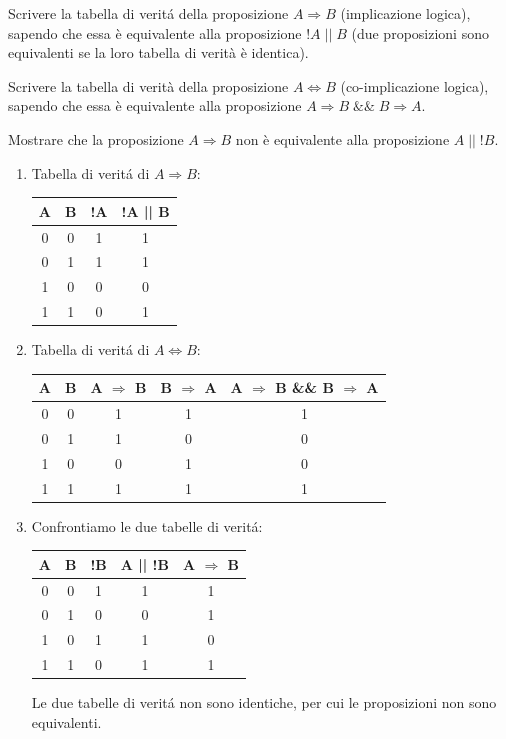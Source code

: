 \begin{Exercise}[label={ex:implicazione}]
		\Question Scrivere la tabella di verit\'a della proposizione $A \Rightarrow B$ (implicazione logica), sapendo che essa \`e equivalente alla proposizione $!A \; || \; B$ (due proposizioni sono equivalenti se la loro tabella di verit\`a \`e identica).

		\Question Scrivere la tabella di verit\`a della proposizione $A \Leftrightarrow B$ (co-implicazione logica), sapendo che essa \`e equivalente alla proposizione $A \Rightarrow B \; \&\& \; B \Rightarrow A$.
		
		\Question Mostrare che la proposizione $A \Rightarrow B$ non \`e equivalente alla proposizione $A \; || \; !B$.
\end{Exercise}

\begin{Answer}[ref={ex:implicazione}]

\begin{enumerate}
	\item Tabella di verit\'a di $A \Rightarrow B$:
	\begin{table}[H]
		\centering
			\begin{tabular}{c | c | c | c}
				A & B & !A & !A || B \\ \hline
				0 & 0 & 1  & 1       \\
				0 & 1 & 1  & 1       \\
				1 & 0 & 0  & 0       \\
				1 & 1 & 0  & 1      
			\end{tabular}
	\end{table}
	\item Tabella di verit\'a di $A \Leftrightarrow B$:
	\begin{table}[H]
		\centering
			\begin{tabular}{c | c | c | c | c}
				A & B & A $\Rightarrow$ B & B $\Rightarrow$ A & A $\Rightarrow$ B \&\& B $\Rightarrow$ A \\ \hline
				0 & 0 & 1  & 1   & 1    \\
				0 & 1 & 1  & 0  & 0     \\
				1 & 0 & 0  & 1  & 0     \\
				1 & 1 & 1 & 1     & 1
			\end{tabular}
	\end{table}
	\item Confrontiamo le due tabelle di verit\'a:
	\begin{table}[H]
		\centering
			\begin{tabular}{c | c | c | c | c}
				A & B & !B & A || !B & A $\Rightarrow$ B \\ \hline
				0 & 0 & 1  & 1  & 1     \\
				0 & 1 & 0 & 0  & 1   \\
				1 & 0 & 1  & 1   & 0    \\
				1 & 1 & 0  & 1     & 1 
			\end{tabular}
	\end{table}
	Le due tabelle di verit\'a non sono identiche, per cui le proposizioni non sono equivalenti.
	
\end{enumerate}

\end{Answer}